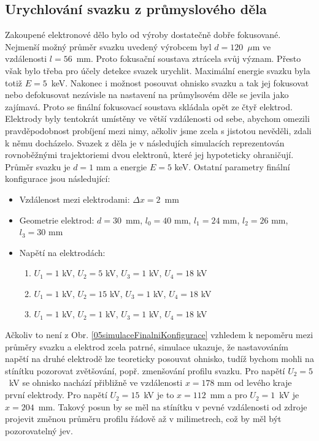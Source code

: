 \subsection{Urychlování svazku z průmyslového děla}

Zakoupené elektronové dělo bylo od výroby dostatečně dobře fokusované. Nejmenší možný průměr svazku uvedený výrobcem byl $d = 120$~$\mu$m ve vzdálenosti $l = 56$~mm. Proto fokusační soustava ztrácela svůj význam. Přesto však bylo třeba pro účely detekce svazek urychlit. Maximální energie svazku byla totiž $E = 5$~keV. Nakonec i možnost posouvat ohnisko svazku a tak jej fokusovat nebo defokusovat nezávisle na nastavení na průmylsovém děle se jevila jako zajímavá. Proto se finální fokusovací soustava skládala opět ze čtyř elektrod.\\

Elektrody byly tentokrát umístěny ve větší vzdálenosti od sebe, abychom omezili pravděpodobnost probíjení mezi nimy, ačkoliv jsme zcela s jistotou nevěděli, zdali k němu docházelo. Svazek z děla je v následujích simulacích reprezentován rovnoběžnými trajektoriemi dvou elektronů, které jej hypoteticky ohraničují. Průměr svazku je $d = 1$ mm a energie $E = 5$ keV. Ostatní parametry finální konfigurace jsou následující:
\begin{itemize}
	\item Vzdálenost mezi elektrodami: $\Delta x = 2$~mm
	\item Geometrie elektrod: $d = 30$~mm, $l_0 = 40$ mm, $l_1 = 24$ mm, $l_2 = 26$ mm, $l_3 = 30$ mm
	\item Napětí na elektrodách:
	\begin{enumerate}
		\item $U_1 = 1$ kV, $U_2 = 5$ kV, $U_3 = 1$ kV, $U_4 = 18$ kV
		\item $U_1 = 1$ kV, $U_2 = 15$ kV, $U_3 = 1$ kV, $U_4 = 18$ kV
		\item $U_1 = 1$ kV, $U_2 = 1$ kV, $U_3 = 1$ kV, $U_4 = 18$ kV
	\end{enumerate}
\end{itemize}

Ačkoliv to není z Obr. \ref{05simulaceFinalniKonfigurace} vzhledem k nepoměru mezi průměry svazku a elektrod zcela patrné, simulace ukazuje, že nastavováním napětí na druhé elektrodě lze teoreticky posouvat ohnisko, tudíž bychom mohli na stínítku pozorovat zvětšování, popř. zmenšování profilu svazku. Pro napětí $U_2 = 5$~kV se ohnisko nachází přibližně ve vzdálenosti $x = 178$ mm od levého kraje první elektrody. Pro napětí $U_2 = 15$~kV je to $x = 112$~mm a pro $U_2 = 1$~kV je $x = 204$~mm. Takový posun by se měl na stínítku v pevné vzdálenosti od zdroje projevit změnou průměru profilu řádově až v milimetrech, což by měl být pozorovatelný jev.\\

